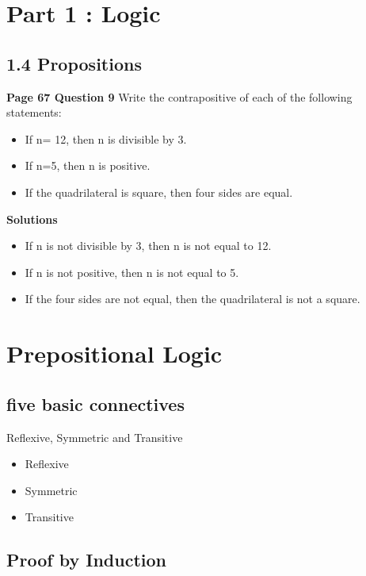 \documentclass[]{report}
\begin{document}
\section*{Part 1 : Logic}

\subsection*{1.4 Propositions}
\textbf{Page 67 Question 9}
Write the contrapositive of each of the following statements:

\begin{itemize}
\item If n= 12, then n is divisible by 3.
\item If n=5, then n is positive.
\item If the quadrilateral is square, then four sides are equal.
\end{itemize}

\textbf{Solutions}
\begin{itemize}
\item If n is not divisible by 3, then n is not equal to 12.
\item If n is not positive, then n is not equal to 5.
\item If the four sides are not equal, then the quadrilateral is not a square.
\end{itemize}

\section*{Prepositional Logic}

\subsection{five basic connectives}


Reflexive, Symmetric and Transitive

\begin{itemize} 
	\item Reflexive
	\item Symmetric
	\item Transitive
\end{itemize}
\subsection{Proof by Induction}
\end{document}
